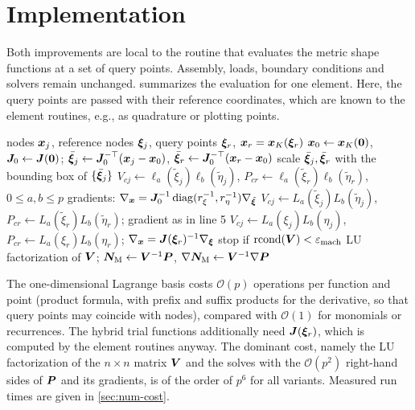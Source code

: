 \section{Implementation}
\label{sec:implementation}
%
Both improvements are local to the routine that evaluates the metric shape functions at a set of query points. Assembly, loads, boundary conditions and solvers remain unchanged.  summarizes the evaluation for one element. Here, the query points are passed with their reference coordinates, which are known to the element routines, e.g., as quadrature or plotting points.

\begin{algorithm}[htbp]
\caption{Metric shape functions of one element at the query points $\bxi_r$ (\PM: trial space $\Qsk$, Lagrange basis; \PH: hybrid trial space $\Tp_p$). Here, $\varepsilon_{\mathrm{mach}}\approx2.2\cdot10^{-16}$ denotes the machine epsilon of double precision.}
\label{alg:metric}
\begin{algorithmic}[1]
\Require nodes $\bm{x}_j$, reference nodes $\bm\xi_j$, query points $\bxi_r$, $\bm{x}_r=\bm{x}_K(\bm\xi_r)$
\State $\bm{x}_0\gets\bm{x}_K(\bm{0})$, $\bm{J}_0\gets\bm{J}(\bm{0})$; $\bar{\bm\xi}_j\gets\bm{J}_0^{-\top}(\bm{x}_j-\bm{x}_0)$, $\bar{\bm\xi}_r\gets\bm{J}_0^{-\top}(\bm{x}_r-\bm{x}_0)$
\State scale $\bar{\bm\xi}_j,\bar{\bm\xi}_r$ with the bounding box of $\{\bar{\bm\xi}_j\}$ 
\If{\PM}
  \State $V_{cj}\gets\ell_a(\tilde\xi_j)\ell_b(\tilde\eta_j)$, $P_{cr}\gets\ell_a(\tilde\xi_r)\ell_b(\tilde\eta_r)$, $0\le a,b\le p$
  \State gradients: $\nabla_{\bm{x}}=\bm{J}_0^{-1}\operatorname{diag}(r_{\xi}^{-1},r_{\eta}^{-1})\nabla_{\tilde{\bm\xi}}$
\Else {}
      \State $V_{cj}\gets L_a(\tilde\xi_j)L_b(\tilde\eta_j)$, $P_{cr}\gets L_a(\tilde\xi_r)L_b(\tilde\eta_r)$; gradient as in line 5
    \Else
      \State $V_{cj}\gets L_a(\xi_j)L_b(\eta_j)$, $P_{cr}\gets L_a(\xi_r)L_b(\eta_r)$; $\nabla_{\bm{x}}=\bm{J}(\bm\xi_r)^{-1}\nabla_{\bm\xi}$
    \EndIf
  \EndFor
\EndIf
\State stop if $\mathrm{rcond}(\bm{V})<\varepsilon_{\mathrm{mach}}$ 
\State LU factorization of $\bm{V}$; $\bm{N}_{\mathrm M}\gets\bm{V}^{-1}\bm{P}$, $\nabla\bm{N}_{\mathrm M}\gets\bm{V}^{-1}\nabla\bm{P}$
\end{algorithmic}
\end{algorithm}

The one-dimensional Lagrange basis costs $\mathcal O(p)$ operations per function and point (product formula, with prefix and suffix products for the derivative, so that query points may coincide with nodes), compared with $\mathcal O(1)$ for monomials or recurrences. The hybrid trial functions additionally need $\bm{J}(\bm\xi_r)$, which is computed by the element routines anyway. The dominant cost, namely the LU factorization of the $n\times n$ matrix $\bm{V}$ and the solves with the $\mathcal O(p^2)$ right-hand sides of $\bm{P}$ and its gradients, is of the order of $p^6$ for all variants. Measured run times are given in \cref{sec:num-cost}.

